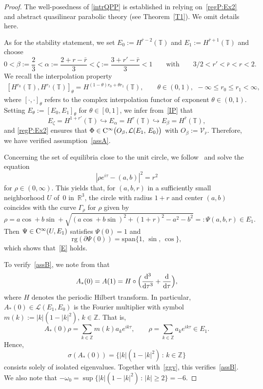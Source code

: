 \documentclass[reqno,11pt]{amsart}
\numberwithin{equation}{section}
\newcommand{\bT}{\mathbb{T}}
\newcommand{\kL}{\mathcal{L}}
\theoremstyle{remark}
\begin{document}
\begin{proof}
The well-posedness of  \eqref{intrQPP} is established in
 \cite[Theorem 1.1]{MW2025x} relying on~\eqref{regP:Ex2} and abstract quasilinear parabolic theory (see Theorem~\ref{T1}). We omit details here.

As for the stability statement, we set $ E_0:=H^{\bar r-2}(\bT)$ and $E_1:= H^{\bar r+1}(\bT)$ and choose 
\[
0<\beta:=\frac{2}{3}<\alpha:=\frac{2+r-\bar r}{3}<\zeta:=\frac{3+r'-\bar r}{3} <1\qquad\text{with}\qquad 3/2<r'<\bar r<r<2.
\]
We recall  the interpolation property 
  \begin{align}\label{IP}
[H^{r_0}(\mathbb{\bT}),H^{r_1}(\mathbb{\bT})]_\theta=H^{(1-\theta)r_0+\theta r_1}(\mathbb{\bT}),\qquad\theta\in(0,1),\ \,  -\infty\leq r_0\leq r_1<\infty,
\end{align}
where $[\cdot,\cdot]_\theta$ refers to the complex interpolation functor of exponent $\theta\in(0,1)$.
Setting $E_\theta:=[E_0,E_1]_{\theta}$ for $\theta\in[0,1]$, we infer from~\eqref{IP} that
 \begin{equation*}
E_\zeta=H^{1+r'}(\bT)\hookrightarrow E_\alpha=H^{r}(\bT)\hookrightarrow E_\beta=H^{\bar r}(\bT),
 \end{equation*}
and \eqref{regP:Ex2} ensures that $\Phi \in {\rm C}^\infty\big(O_\beta, \mathcal{L}(E_1,\, E_0)\big)$ with $O_\beta:=\mathcal{V}_{\bar r}$.
Therefore, we have verified assumption~\eqref{assA}.


Concerning the set of equilibria close to the unit circle, we follow~\cite{ES98} and solve the equation
\[
|\rho e^{i\tau} - (a,b)|^2 = r^2
\]
for $\rho\in (0,\infty)$. This yields that, for $(a,b,r)$ in a sufficiently small neighborhood 
$U$ of~$0$ in~$\mathbb{R}^3$, the circle with radius $1+r$ and center $(a,b)$  coincides with the curve $\Gamma_\rho$  for $\rho$ given  by 
\[
\rho
= a\cos  + b\sin  
+ \sqrt{(a\cos  + b\sin )^2 + (1+r)^2 - a^2 - b^2}=:\Psi(a,b,r)\in E_1.
\]
Then $\Psi\in {\rm C}^\infty(U,E_1)$ satisfies $\Psi(0)=1$ and  
\begin{equation}\label{ggv}
\mathrm{rg}(\partial \Psi(0))
= \mathrm{span}\{1,\, \sin,\, \cos\},
\end{equation}
which shows that~\eqref{E}  holds.

To verify~\eqref{assB}, we  note from \cite[Section~5]{MW2025x}  that
\[
A_*(0)=A(1)=H\circ\Big(\frac{{\rm d}^3}{{\rm d}\tau^3}+\frac{{\rm d}}{{\rm d}\tau}\Big),
\]
where $H$ denotes the periodic Hilbert transform. 
In particular, $A_*(0)\in\kL(E_1,E_0)$ is the Fourier multiplier with symbol~$m(k):=|k|(1-|k|^2)$, $k\in\mathbb{Z}$.  That is,
\[
A_*(0)\rho=\sum_{k\in\mathbb{Z}} m(k)a_k e^{ik\tau},\qquad \rho=\sum_{k\in\mathbb{Z}} a_k e^{ik\tau}\in E_1.
\]
Hence,
\[
\sigma(A_*(0))=\{|k|(1-|k|^2)\,:\, k\in\mathbb{Z}\}
\]
 consists solely of isolated eigenvalues. 
Together with~\eqref{ggv}, this verifies~\eqref{assB}.  We also note  that  $-\omega_0=\sup\{|k|(1-|k|^2)\,:\, |k|\geq 2\}=-6$.
 

\end{proof}
\end{document}
